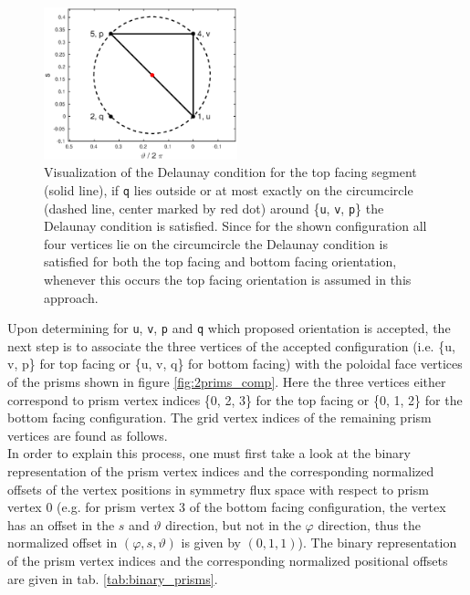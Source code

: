 \documentclass[./main.tex]{subfiles}
\begin{document}
 \begin{figure}[!ht]
 \begin{center}
	\includegraphics[width=0.5\textwidth]{figures/uvpq_Delaunay.eps}
	\caption{Visualization of the Delaunay condition for the top facing segment (solid line), if \texttt{q} lies outside or at most exactly on the circumcircle (dashed line, center marked by red dot) around \{\texttt{u}, \texttt{v}, \texttt{p}\} the Delaunay condition is satisfied. Since for the shown configuration all four vertices lie on the circumcircle the Delaunay condition is satisfied for both the top facing and bottom facing orientation, whenever this occurs the top facing orientation is assumed in this approach.}
	\label{fig:uvpq_Delaunay}
	\end{center} 
\end{figure}

Upon determining for \texttt{u}, \texttt{v}, \texttt{p} and \texttt{q} which proposed orientation is accepted, the next step is to associate the three vertices of the accepted configuration (i.e. \{u, v, p\} for top facing or \{u, v, q\} for bottom facing) with the poloidal face vertices of the prisms shown in figure \ref{fig:2prims_comp}. Here the three vertices either correspond to prism vertex indices \{0, 2, 3\} for the top facing or \{0, 1, 2\} for the bottom facing  configuration. The grid vertex indices of the remaining prism vertices are found as follows.\\
In order to explain this process, one must first take a look at the binary representation of the prism vertex indices and the corresponding normalized offsets of the vertex positions in symmetry flux space with respect to prism vertex 0 (e.g. for prism vertex 3 of the bottom facing configuration, the vertex has an offset in the $s$ and $\vartheta$ direction, but not in the $\varphi$ direction, thus the normalized offset in $(\varphi, s, \vartheta)$ is given by $(0, 1, 1)$). The binary representation of the prism vertex indices and the corresponding normalized positional offsets are given in tab. \ref{tab:binary_prisms}. 
 
\end{document}
